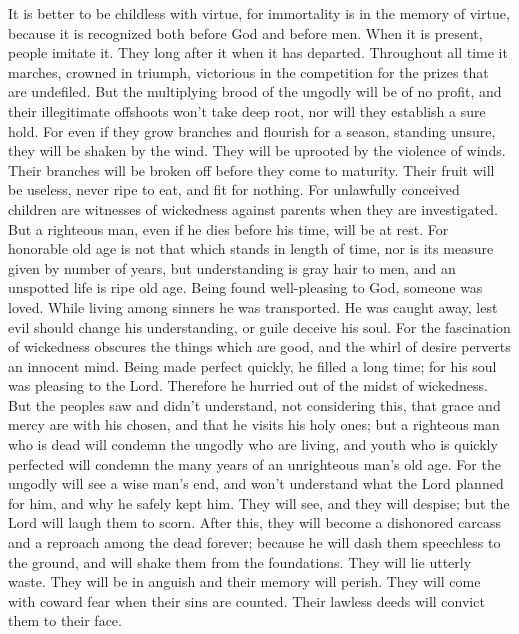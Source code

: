  It is better to be childless with virtue, for immortality
is in the memory of virtue, because it is recognized both before God and
before men.  When it is present, people imitate it. They
long after it when it has departed. Throughout all time it marches,
crowned in triumph, victorious in the competition for the prizes that
are undefiled.  But the multiplying brood of the ungodly
will be of no profit, and their illegitimate offshoots won't take deep
root, nor will they establish a sure hold.  For even if
they grow branches and flourish for a season, standing unsure, they will
be shaken by the wind. They will be uprooted by the violence of winds.
 Their branches will be broken off before they come to
maturity. Their fruit will be useless, never ripe to eat, and fit for
nothing.  For unlawfully conceived children are witnesses
of wickedness against parents when they are investigated. 
But a righteous man, even if he dies before his time, will be at rest.
 For honorable old age is not that which stands in length
of time, nor is its measure given by number of years,  but
understanding is gray hair to men, and an unspotted life is ripe old
age.  Being found well-pleasing to God, someone was
loved. While living among sinners he was transported.  He
was caught away, lest evil should change his understanding, or guile
deceive his soul.  For the fascination of wickedness
obscures the things which are good, and the whirl of desire perverts an
innocent mind.  Being made perfect quickly, he filled a
long time;  for his soul was pleasing to the Lord.
Therefore he hurried out of the midst of wickedness.  But
the peoples saw and didn't understand, not considering this, that grace
and mercy are with his chosen, and that he visits his holy ones;
 but a righteous man who is dead will condemn the ungodly
who are living, and youth who is quickly perfected will condemn the many
years of an unrighteous man's old age.  For the ungodly
will see a wise man's end, and won't understand what the Lord planned
for him, and why he safely kept him.  They will see, and
they will despise; but the Lord will laugh them to scorn. After this,
they will become a dishonored carcass and a reproach among the dead
forever;  because he will dash them speechless to the
ground, and will shake them from the foundations. They will lie utterly
waste. They will be in anguish and their memory will perish.
 They will come with coward fear when their sins are
counted. Their lawless deeds will convict them to their face.

